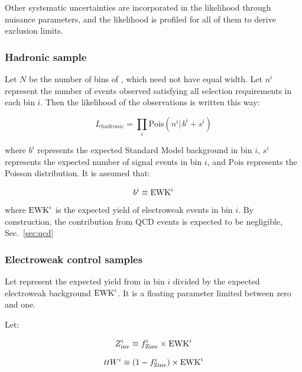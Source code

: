 Other systematic uncertainties are incorporated in the likelihood through nuisance parameters, 
and the likelihood is profiled for all of them to derive exclusion limits. 

\subsubsection{Hadronic sample}
Let $N$ be the number of bins of \HT, which need not have equal width.
Let $n^i$ represent the number of events observed satisfying all
selection requirements in each \HT bin $i$.  Then the likelihood of
the observations is written this way:

\begin{equation}
L_{hadronic}=\prod_i \mathrm{Pois}(n^i |\, b^i + s^i)
\label{eq:hadronicLikelihood}
\end{equation}

where $b^i$ represents the expected Standard Model background in bin
$i$, $s^i$ represents the expected number of signal events in bin $i$,
and $\mathrm{Pois}$ represents the Poisson distribution.  It is
assumed that:

\begin{equation}
  b^i\equiv \ewk^i
  \label{eq:ewkTotal}
\end{equation}

where $\ewk^i$ is the expected yield of electroweak events in bin $i$.
By construction, the contribution from QCD events is expected to be negligible, 
Sec.~\ref{sec:qcd}



\subsubsection{Electroweak control samples\label{sec:ewk}}
Let  represent the expected yield from \znunu in bin $i$
divided by the expected electroweak background $\ewk^{i}$.  It is
a floating parameter limited between zero and one.

Let:

\begin{equation}
  \zInv{i} \equiv \fZinv{i} \times \ewk^i 
  \label{eq:ZinvEwk}
\end{equation}

\begin{equation}
  ttW^{i} \equiv (1-\fZinv{i})\times \ewk^i
  \label{eq:ttWEwk}
\end{equation}


